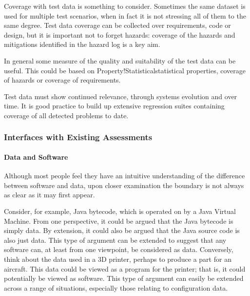 Coverage with test data is something to consider. Sometimes the same \gls{dataset} is used for multiple test scenarios, when in fact it is not stressing all of them to the same degree. Test data coverage can be collected over requirements, code or design, but it is important not to forget hazards: coverage of the hazards and mitigations identified in the \gls{hazard log} is a key aim. 

In general some measure of the quality and suitability of the test data can be useful. This could be based on {Property!Statistical}statistical properties, coverage of hazards or coverage of requirements. 

Test data must show continued relevance, through systems evolution and over time. It is good practice to build up extensive regression suites containing coverage of all detected problems to date.

\subsubsection{Interfaces with Existing Assessments}
\paragraph{Data and Software}
Although most people feel they have an intuitive understanding of the difference between software and data, upon closer examination the boundary is not always as clear as it may first appear.

Consider, for example, Java bytecode, which is operated on by a Java Virtual Machine. From one perspective, it could be argued that the Java bytecode is simply data. By extension, it could also be argued that the Java source code is also just data. This type of argument can be extended to suggest that any software can, at least from one viewpoint, be considered as data. Conversely, think about the data used in a 3D printer, perhaps to produce a part for an aircraft. This data could be viewed as a program for the printer; that is, it could potentially be viewed as software. This type of argument can easily be extended across a range of situations, especially those relating to \gls{configuration data}.

